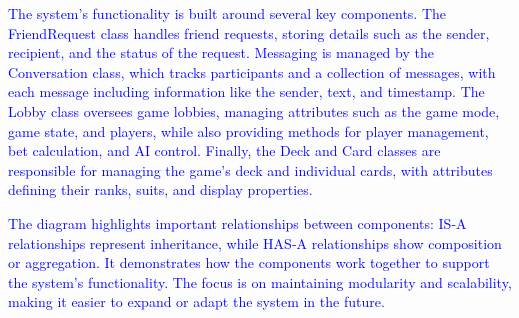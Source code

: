 \noindent \textcolor{blue}{The system’s functionality is built around several key components. The FriendRequest class handles friend requests, storing details such as the sender, recipient, and the status of the request. Messaging is managed by the Conversation class, which tracks participants and a collection of messages, with each message including information like the sender, text, and timestamp. The Lobby class oversees game lobbies, managing attributes such as the game mode, game state, and players, while also providing methods for player management, bet calculation, and AI control. Finally, the Deck and Card classes are responsible for managing the game’s deck and individual cards, with attributes defining their ranks, suits, and display properties.}

\noindent \textcolor{blue}{The diagram highlights important relationships between components: IS-A relationships represent inheritance, while HAS-A relationships show composition or aggregation. It demonstrates how the components work together to support the system's functionality. The focus is on maintaining modularity and scalability, making it easier to expand or adapt the system in the future.}

